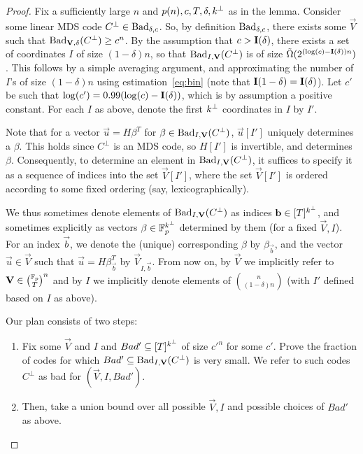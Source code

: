 \begin{proof}
Fix a sufficiently large $n$ and $p(n),c,T,\delta,k^\bot$ as in the lemma. Consider some linear MDS code $C^\bot\in \textnormal{Bad}_{\delta,c}$. %
So, by definition $\textnormal{Bad}_{\delta,c}$, there exists some $\vec{V}$ such that $\textnormal{Bad}_{\mathbf{V},\delta}(C^\bot)\geq c^n$. 
By the assumption that $c>\mathbf{I}({\delta})$, there exists a set of coordinates $I$ of size $(1-\delta)n$, so that  $\textnormal{Bad}_{I,\mathbf{V}}(C^\bot)$ is of size $\tilde{\Omega}(2^{(\log(c)-\mathbf{I}({\delta}))n})$. This follows by a simple averaging argument, and approximating the number of $I$'s of size $(1-\delta)n$ using estimation~\ref{eq:bin} (note that $\mathbf{I}({1-\delta})=\mathbf{I}({\delta})$). 
Let $c'$ be such that $\log(c')=0.99(\log(c)-\mathbf{I}({\delta}))$, which is by assumption a positive constant. For each $I$ as above, denote the first $k^\bot$ coordinates in $I$ by $I'$. 

Note that for a vector $\vec{u}=H\beta^T$ for $\beta\in\textnormal{Bad}_{I,\mathbf{V}}(C^\bot)$, $\vec{u}[I']$ uniquely determines a $\beta$. This holds since $C^\bot$ is an MDS code, so $H[I']$ is invertible, and determines $\beta$. Consequently, to determine an element in $\textnormal{Bad}_{I,\mathbf{V}}(C^\bot)$, it suffices to specify it as a sequence of indices into the set $\vec{V}[I']$, where the set $\vec{V}[I']$ is ordered according to some fixed ordering (say, lexicographically).

We thus sometimes denote elements of $\textnormal{Bad}_{I,\mathbf{V}}(C^\bot)$ as indices $\mathbf{b}\in [T]^{k^\bot}$, and sometimes explicitly as vectors $\beta\in \mathbb{F}^{k^\bot}_p$ determined by them (for a fixed $\vec{V},I$). For an index $\vec{b}$, we denote the (unique) corresponding $\beta$ by $\beta_\vec{b}$, and the vector $\vec{u}\in \vec{V}$ such that $\vec{u}=H\beta^T_\vec{b}$ by $\vec{V}_{I,\vec{b}}$.
From now on, by $\vec{V}$ we implicitly refer to $\vec{V}\in {\binom{\F_p}{T}}^n$ and by $I$ we implicitly denote elements of $\binom{n}{(1-\delta)n}$ (with $I'$ defined based on $I$ as above).

\noindent Our plan consists of two steps:
\begin{enumerate}
\item Fix some $\vec{V}$ and $I$ and $Bad'\subseteq [T]^{k^\bot}$ of size ${c'}^n$ 
for some $c'$. Prove the fraction of codes for which $Bad'\subseteq \textnormal{Bad}_{I,\mathbf{V}}(C^\bot)$ is very small. We refer to such codes $C^\bot$ as bad for $(\vec{V},I,Bad')$. 
\item Then, take a union bound over all possible $\vec{V},I$ and possible choices of $Bad'$ as above.
\end{enumerate}


\end{proof}
